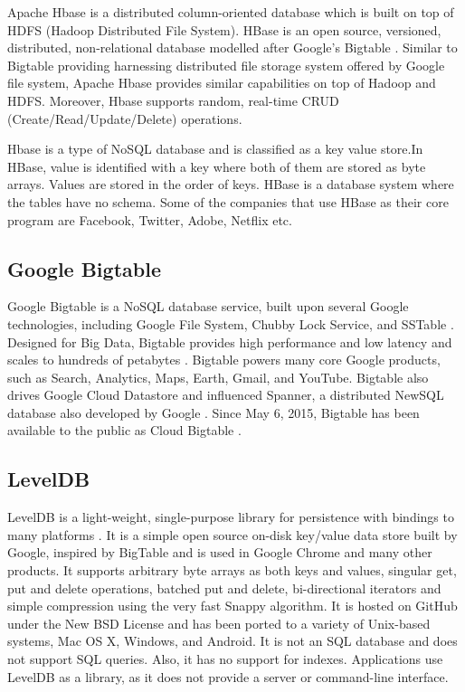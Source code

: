 {     Apache Hbase is a distributed column-oriented database
     which is built on top of HDFS (Hadoop Distributed File
     System). HBase is an open source,
     versioned, distributed, non-relational database modelled after
     Google’s Bigtable \cite{www-hbase}. Similar to Bigtable providing harnessing
     distributed file storage system offered by Google file system,
     Apache Hbase provides similar capabilities on top of Hadoop and
     HDFS. Moreover, Hbase supports random, real-time CRUD
     (Create/Read/Update/Delete) operations.

     Hbase is a type of NoSQL database and is classified as a key
     value store.In HBase, value is identified with a key where both of
     them are stored as byte arrays. Values are stored in the order of
     keys. HBase is a database system where the tables have no
     schema. Some of the companies that use HBase as their core
     program are Facebook, Twitter, Adobe, Netflix etc.

     \pv

\subsection{Google Bigtable}

     Google Bigtable is a NoSQL database service, built upon several
     Google technologies, including Google File System, Chubby Lock
     Service, and SSTable \cite{www-cloudbigtable}.  Designed for Big
     Data, Bigtable provides high performance and low latency and
     scales to hundreds of petabytes
     \cite{www-cloudbigtable}. Bigtable powers many core Google
     products, such as Search, Analytics, Maps, Earth, Gmail, and
     YouTube. Bigtable also drives Google Cloud Datastore and
     influenced Spanner, a distributed NewSQL database also developed
     by Google \cite{www-wikispanner} \cite{www-wikibigtable}.
     Since May 6, 2015, Bigtable has been available to the public as
     Cloud Bigtable \cite{www-wikibigtable}.

\subsection{LevelDB}

     LevelDB is a light-weight, single-purpose library for persistence
     with bindings to many platforms \cite{www-leveldb}. It is a
     simple open source on-disk key/value data store built by Google,
     inspired by BigTable and is used in Google Chrome and many other
     products. It supports arbitrary byte arrays as both keys and
     values, singular get, put and delete operations, batched put and
     delete, bi-directional iterators and simple compression using the
     very fast Snappy algorithm. It is hosted on GitHub under the New
     BSD License and has been ported to a variety of Unix-based
     systems, Mac OS X, Windows, and Android. It is not an SQL
     database and does not support SQL queries. Also, it has no
     support for indexes. Applications use LevelDB as a library, as it
     does not provide a server or command-line interface.

}

